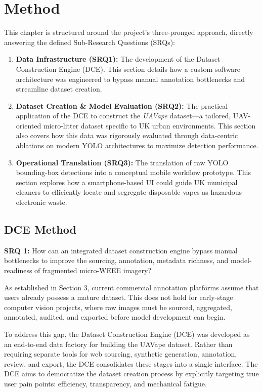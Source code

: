 \section{Method}

This chapter is structured around the project's three-pronged approach, directly answering the defined Sub-Research Questions (SRQs):

\begin{enumerate}
\item \textbf{Data Infrastructure (SRQ1):} The development of the Dataset Construction Engine (DCE). This section details how a custom software architecture was engineered to bypass manual annotation bottlenecks and streamline dataset creation.
\item \textbf{Dataset Creation \& Model Evaluation (SRQ2):} The practical application of the DCE to construct the \textit{UAVape} dataset—a tailored, UAV-oriented micro-litter dataset specific to UK urban environments. This section also covers how this data was rigorously evaluated through data-centric ablations on modern YOLO architectures to maximize detection performance.
\item \textbf{Operational Translation (SRQ3):} The translation of raw YOLO bounding-box detections into a conceptual mobile workflow prototype. This section explores how a smartphone-based UI could guide UK municipal cleaners to efficiently locate and segregate disposable vapes as hazardous electronic waste.
\end{enumerate}


\subsection{DCE Method}

\textbf{SRQ 1:} How can an integrated dataset construction engine bypass manual bottlenecks to improve the sourcing, annotation, metadata richness, and model-readiness of fragmented micro-WEEE imagery?

As established in Section 3, current commercial annotation platforms assume that users already possess a mature dataset. This does not hold for early-stage computer vision projects, where raw images must be sourced, aggregated, annotated, audited, and exported before model development can begin.

To address this gap, the Dataset Construction Engine (DCE) was developed as an end-to-end data factory for building the UAVape dataset. Rather than requiring separate tools for web sourcing, synthetic generation, annotation, review, and export, the DCE consolidates these stages into a single interface. The DCE aims to democratize the dataset creation process by explicitly targeting true user pain points: efficiency, transparency, and mechanical fatigue. 

